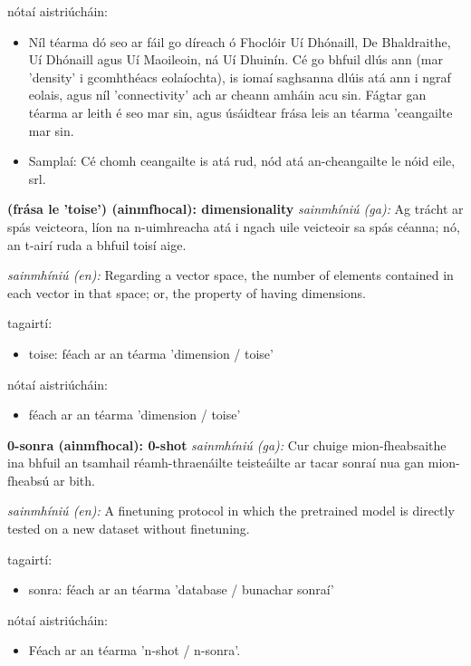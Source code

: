 \documentclass{article}
\begin{document}
nótaí aistriúcháin:
\begin{itemize}
	\item Níl téarma dó seo ar fáil go díreach ó Fhoclóir Uí Dhónaill, De Bhaldraithe, Uí Dhónaill agus Uí Maoileoin, ná Uí Dhuinín. Cé go bhfuil dlús ann (mar 'density' i gcomhthéacs eolaíochta), is iomaí saghsanna dlúis atá ann i ngraf eolais, agus níl 'connectivity' ach ar cheann amháin acu sin. Fágtar gan téarma ar leith é seo mar sin, agus úsáidtear frása leis an téarma 'ceangailte mar sin.
	\item Samplaí: Cé chomh ceangailte is atá rud, nód atá an-cheangailte le nóid eile, srl.
\end{itemize}


\textbf{(frása le 'toise') (ainmfhocal): dimensionality}
\textit{sainmhíniú (ga):} Ag trácht ar spás veicteora, líon na n-uimhreacha atá i ngach uile veicteoir sa spás céanna; nó, an t-airí ruda a bhfuil toisí aige.

\textit{sainmhíniú (en):} Regarding a vector space, the number of elements contained in each vector in that space; or, the property of having dimensions.

tagairtí:
\begin{itemize}
	\item toise: féach ar an téarma 'dimension / toise'
\end{itemize}

nótaí aistriúcháin:
\begin{itemize}
	\item féach ar an téarma 'dimension / toise'
\end{itemize}


\textbf{0-sonra (ainmfhocal): 0-shot}
\textit{sainmhíniú (ga):} Cur chuige mion-fheabsaithe ina bhfuil an tsamhail réamh-thraenáilte teisteáilte ar tacar sonraí nua gan mion-fheabsú ar bith.

\textit{sainmhíniú (en):} A finetuning protocol in which the pretrained model is directly tested on a new dataset without finetuning.

tagairtí:
\begin{itemize}
	\item sonra: féach ar an téarma 'database / bunachar sonraí'
\end{itemize}

nótaí aistriúcháin:
\begin{itemize}
	\item Féach ar an téarma 'n-shot / n-sonra'.
\end{itemize}
\end{document}
